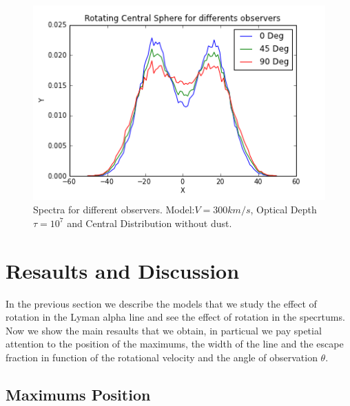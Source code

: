 \documentclass{article}
\theoremstyle{definition}
\theoremstyle{remark}
\begin{document}
\begin{figure}[H]
\begin{center}
\includegraphics[scale=0.45]{Observers.png}
\end{center}
\caption{Spectra for different observers. Model:$V=300km/s$, Optical Depth $\tau=10^{7}$ and Central Distribution without dust.}
\end{figure}




\section*{Resaults and Discussion}
\label{sec:Results_ly_Rotation}


In the previous section we describe the models that we study the
effect of rotation in the Lyman alpha line and see the effect of
rotation in the specrtums. Now we show the main resaults that we
obtain, in particual we pay spetial attention to the position of the
maximums, the width of the line and the escape fraction in function of
the rotational velocity and the angle of observation $\theta$.  

\subsection*{Maximums Position}
\end{document}
